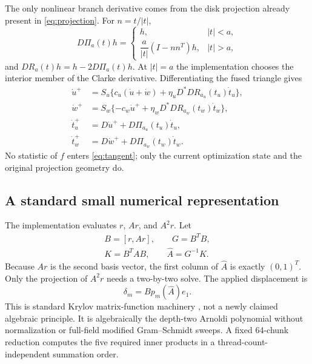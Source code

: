 \documentclass[10pt,twocolumn]{article}
\theoremstyle{definition}\newtheorem{remark}[proposition]{Remark}
\newcommand{\PiD}{\Pi}
\begin{document}
The only nonlinear branch derivative comes from the disk projection already
present in \eqref{eq:projection}.  For $n=t/|t|$,
\begin{equation}
D\PiD_a(t)h=\begin{cases}
h,&|t|<a,\\[2pt]
\dfrac{a}{|t|}(I-nn^T)h,&|t|>a,
\end{cases}
\label{eq:diskderivative}
\end{equation}
and $DR_a(t)h=h-2D\PiD_a(t)h$.  At $|t|=a$ the implementation chooses the
interior member of the Clarke derivative.  Differentiating the fused triangle
gives
\begin{align}
\dot u^+&=S_u\{c_u(\dot u+\dot w)
+\eta_uD^*DR_{a_u}(t_u)\dot t_u\},\nonumber\\
\dot w^+&=S_w\{-c_w\dot u^+
+\eta_wD^*DR_{a_w}(t_w)\dot t_w\},\label{eq:tangent}\\
\dot t_u^+&=D\dot u^++D\PiD_{a_u}(t_u)\dot t_u,\nonumber\\
\dot t_w^+&=D\dot w^++D\PiD_{a_w}(t_w)\dot t_w.\nonumber
\end{align}
No statistic of $f$ enters \eqref{eq:tangent}; only the current optimization
state and the original projection geometry do.

\subsection{A standard small numerical representation}

The implementation evaluates $r$, $Ar$, and $A^2r$.  Let
\begin{equation}
\begin{gathered}
B=[r,Ar],\qquad G=B^TB,\\
K=B^TAB,\qquad \widehat A=G^{-1}K.
\end{gathered}
\label{eq:galerkin}
\end{equation}
Because $Ar$ is the second basis vector, the first column of $\widehat A$ is
exactly $(0,1)^T$.  Only the projection of $A^2r$ needs a two-by-two solve.
The applied displacement is
\begin{equation}
\delta_m=Bp_m(\widehat A)e_1.
\label{eq:krylovjump}
\end{equation}
This is standard Krylov matrix-function machinery \cite{saad1992,jia2015}, not a newly claimed algebraic principle. It is algebraically the depth-two Arnoldi polynomial without normalization
or full-field modified Gram--Schmidt sweeps.  A fixed 64-chunk reduction
computes the five required inner products in a thread-count-independent
summation order.
\end{document}
